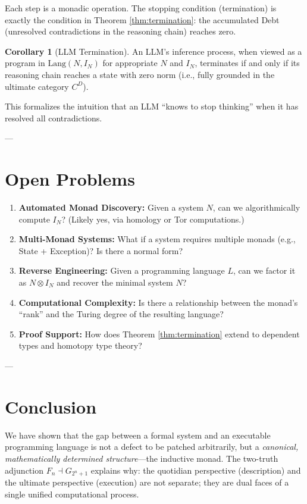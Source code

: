 \documentclass[a4paper,11pt]{article}
\theoremstyle{definition}
\newtheorem{corollary}{Corollary}[section]
\begin{document}
Each step is a monadic operation. The stopping condition (termination) is exactly the condition in Theorem \ref{thm:termination}: the accumulated Debt (unresolved contradictions in the reasoning chain) reaches zero.

\begin{corollary}[LLM Termination]
An LLM's inference process, when viewed as a program in $\text{Lang}(N, I_N)$ for appropriate $N$ and $I_N$, terminates if and only if its reasoning chain reaches a state with zero norm (i.e., fully grounded in the ultimate category $C^D$).
\end{corollary}

This formalizes the intuition that an LLM ``knows to stop thinking'' when it has resolved all contradictions.

---

\section{Open Problems}

\begin{enumerate}
  \item \textbf{Automated Monad Discovery:} Given a system $N$, can we algorithmically compute $I_N$? (Likely yes, via homology or Tor computations.)
  
  \item \textbf{Multi-Monad Systems:} What if a system requires multiple monads (e.g., State + Exception)? Is there a normal form?
  
  \item \textbf{Reverse Engineering:} Given a programming language $L$, can we factor it as $N \otimes I_N$ and recover the minimal system $N$?
  
  \item \textbf{Computational Complexity:} Is there a relationship between the monad's ``rank'' and the Turing degree of the resulting language?
  
  \item \textbf{Proof Support:} How does Theorem \ref{thm:termination} extend to dependent types and homotopy type theory?
\end{enumerate}

---

\section{Conclusion}

We have shown that the gap between a formal system and an executable programming language is not a defect to be patched arbitrarily, but a \emph{canonical, mathematically determined structure}—the inductive monad. The two-truth adjunction $F_n \dashv G_{2^n+1}$ explains why: the quotidian perspective (description) and the ultimate perspective (execution) are not separate; they are dual faces of a single unified computational process.
\end{document}
